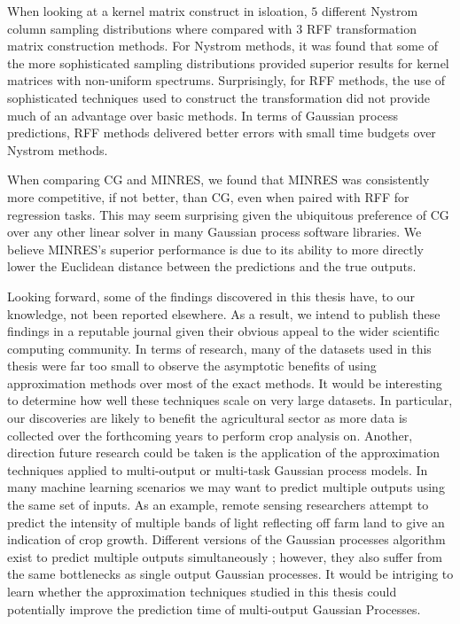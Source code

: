 When looking at a kernel matrix construct in isloation, $5$ different Nystrom column sampling distributions where compared with $3$ RFF transformation matrix construction methods. For Nystrom methods, it was found that some of the more sophisticated sampling distributions provided superior results for kernel matrices with non-uniform spectrums. Surprisingly, for RFF methods, the use of sophisticated techniques used to construct the transformation did not provide much of an advantage over basic methods. In terms of Gaussian process predictions, RFF methods delivered better errors with small time budgets over Nystrom methods.

When comparing CG and MINRES, we found that MINRES was consistently more competitive, if not better, than CG, even when paired with RFF for regression tasks. This may seem surprising given the ubiquitous preference of CG over any other linear solver in many Gaussian process software libraries. We believe MINRES's superior performance is due to its ability to more directly lower the Euclidean distance between the predictions and the true outputs.

Looking forward, some of the findings discovered in this thesis have, to our knowledge, not been reported elsewhere. As a result, we intend to publish these findings in a reputable journal given their obvious appeal to the wider scientific computing community. In terms of research, many of the datasets used in this thesis were far too small to observe the asymptotic benefits of using approximation methods over most of the exact methods. It would be interesting to determine how well these techniques scale on very large datasets. In particular, our discoveries are likely to benefit the agricultural sector as more data is collected over the forthcoming years to perform crop analysis on. Another, direction future research could be taken is the application of the approximation techniques applied to multi-output or multi-task Gaussian process models. In many machine learning scenarios we may want to predict multiple outputs using the same set of inputs. As an example, remote sensing researchers attempt to predict the intensity of multiple bands of light reflecting off farm land to give an indication of crop growth. Different versions of the Gaussian processes algorithm exist to predict multiple outputs simultaneously \cite{NIPS2007_66368270}; however, they also suffer from the same bottlenecks as single output Gaussian processes. It would be intriging to learn whether the approximation techniques studied in this thesis could potentially improve the prediction time of multi-output Gaussian Processes.